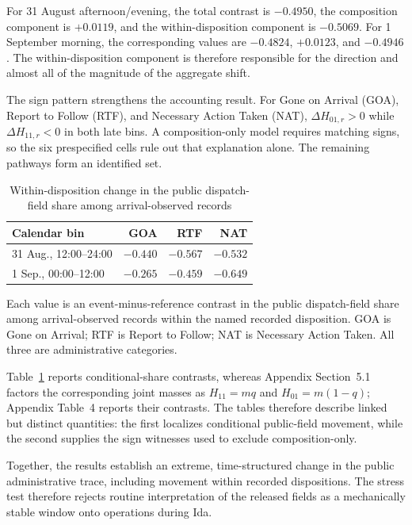 \documentclass[11pt]{article}
\begin{document}
For 31 August afternoon/evening, the total contrast is $-0.4950$, the composition component is $+0.0119$, and the within-disposition component is $-0.5069$. For 1 September morning, the corresponding values are $-0.4824$, $+0.0123$, and $-0.4946$. The within-disposition component is therefore responsible for the direction and almost all of the magnitude of the aggregate shift.

The sign pattern strengthens the accounting result. For Gone on Arrival (GOA), Report to Follow (RTF), and Necessary Action Taken (NAT), $\Delta H_{01,r}>0$ while $\Delta H_{11,r}<0$ in both late bins. A composition-only model requires matching signs, so the six prespecified cells rule out that explanation alone. The remaining pathways form an identified set.

\begin{table}[H]
\centering
\caption{Within-disposition change in the public dispatch-field share among arrival-observed records}
\label{tab:disp}
\begin{tabular}{@{}lrrr@{}}
\toprule
Calendar bin & GOA & RTF & NAT \\
\midrule
31 Aug., 12:00--24:00 & $-0.440$ & $-0.567$ & $-0.532$ \\
1 Sep., 00:00--12:00 & $-0.265$ & $-0.459$ & $-0.649$ \\
\bottomrule
\end{tabular}
\begin{minipage}{0.94\textwidth}\footnotesize
Each value is an event-minus-reference contrast in the public dispatch-field share among arrival-observed records within the named recorded disposition. GOA is Gone on Arrival; RTF is Report to Follow; NAT is Necessary Action Taken. All three are administrative categories.
\end{minipage}
\end{table}

Table~\ref{tab:disp} reports conditional-share contrasts, whereas Appendix Section~5.1 factors the corresponding joint masses as $H_{11}=mq$ and $H_{01}=m(1-q)$; Appendix Table~4 reports their contrasts. The tables therefore describe linked but distinct quantities: the first localizes conditional public-field movement, while the second supplies the sign witnesses used to exclude composition-only.

Together, the results establish an extreme, time-structured change in the public administrative trace, including movement within recorded dispositions. The stress test therefore rejects routine interpretation of the released fields as a mechanically stable window onto operations during Ida.
\end{document}
